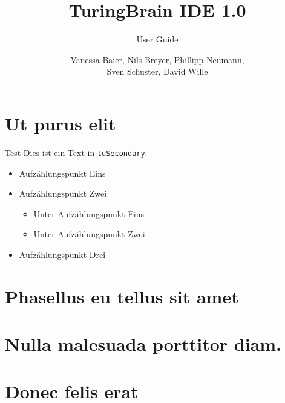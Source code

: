 \documentclass[%
  a4paper,%
  11pt,%
  style=screen,
  blue,%
  ]{tubsartcl}
\title{TuringBrain IDE \LARGE 1.0}
\subtitle{User Guide}
\author{\small Vanessa Baier, Nils Breyer, Phillipp Neumann,\\ Sven Schuster, David Wille}
\begin{document}
\maketitle[image,logo=right]%
\makebackpage[trisec]%

\tableofcontents
\newpage
\section{Ut purus elit}

Test \textcolor{tuSecondary}{Dies ist ein Text in \texttt{tuSecondary}.}\bigskip


\begin{itemize}
  \item Aufzählungspunkt Eins
  \item Aufzählungspunkt Zwei
    \begin{itemize}
      \item Unter-Aufzählungspunkt Eins
      \item Unter-Aufzählungspunkt Zwei
    \end{itemize}
  \item Aufzählungspunkt Drei
\end{itemize}

\section{Phasellus eu tellus sit amet}


\section{Nulla malesuada porttitor diam.}


\section{Donec felis erat}
\end{document}
